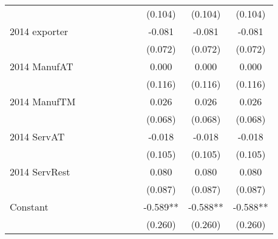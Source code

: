 \begin{table}[htbp]
\begin{tabular}{l*{9}{c}}
                    &               &               &               &               &               &               &     (0.104)   &     (0.104)   &     (0.104)   \\
2014 exporter       &               &               &               &               &               &               &      -0.081   &      -0.081   &      -0.081   \\
                    &               &               &               &               &               &               &     (0.072)   &     (0.072)   &     (0.072)   \\
2014 ManufAT        &               &               &               &               &               &               &       0.000   &       0.000   &       0.000   \\
                    &               &               &               &               &               &               &     (0.116)   &     (0.116)   &     (0.116)   \\
2014 ManufTM        &               &               &               &               &               &               &       0.026   &       0.026   &       0.026   \\
                    &               &               &               &               &               &               &     (0.068)   &     (0.068)   &     (0.068)   \\
2014 ServAT         &               &               &               &               &               &               &      -0.018   &      -0.018   &      -0.018   \\
                    &               &               &               &               &               &               &     (0.105)   &     (0.105)   &     (0.105)   \\
2014 ServRest       &               &               &               &               &               &               &       0.080   &       0.080   &       0.080   \\
                    &               &               &               &               &               &               &     (0.087)   &     (0.087)   &     (0.087)   \\
Constant            &               &               &               &               &               &               &      -0.589** &      -0.588** &      -0.588** \\
                    &               &               &               &               &               &               &     (0.260)   &     (0.260)   &     (0.260)   \\

\end{tabular}
\end{table}
